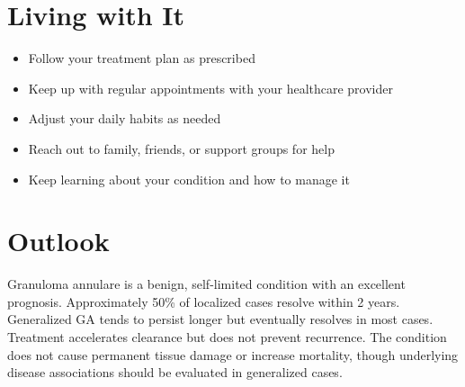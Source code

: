 \section{Living with It}

\begin{itemize}[noitemsep]
  \item Follow your treatment plan as prescribed
  \item Keep up with regular appointments with your healthcare provider
  \item Adjust your daily habits as needed
  \item Reach out to family, friends, or support groups for help
  \item Keep learning about your condition and how to manage it
\end{itemize}

\section{Outlook}
Granuloma annulare is a benign, self-limited condition with an excellent prognosis. Approximately 50\% of localized cases resolve within 2 years. Generalized GA tends to persist longer but eventually resolves in most cases. Treatment accelerates clearance but does not prevent recurrence. The condition does not cause permanent tissue damage or increase mortality, though underlying disease associations should be evaluated in generalized cases.
